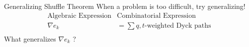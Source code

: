 \documentclass[dvipsnames]{beamer}
\newcommand{\sym}{\Lambda}
\theoremstyle{definition}
\newcounter{c}
\begin{document}
\begin{frame}{Generalizing Shuffle Theorem}
  When a problem is too difficult, try generalizing! \pause
  \begin{eqnarray*}
    \text{Algebraic Expression} & \text{Combinatorial Expression}\\
    \nabla e_k & = \sum q,t\text{-weighted Dyck paths}\\
  \end{eqnarray*}\pause
  What generalizes \(\nabla e_k\) ?
\end{frame}
  

\end{document}
